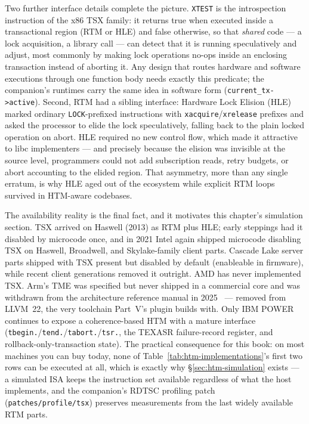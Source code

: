 Two further interface details complete the picture. \texttt{XTEST} is the introspection instruction of the x86 TSX family: it returns true when executed inside a transactional region (RTM or HLE) and false otherwise, so that \emph{shared} code --- a lock acquisition, a library call --- can detect that it is running speculatively and adjust, most commonly by making lock operations no-ops inside an enclosing transaction instead of aborting it. Any design that routes hardware and software executions through one function body needs exactly this predicate; the companion's runtimes carry the same idea in software form (\texttt{current\_tx->active}). Second, RTM had a sibling interface: Hardware Lock Elision (HLE) marked ordinary \texttt{LOCK}-prefixed instructions with \texttt{xacquire}/\texttt{xrelease} prefixes and asked the processor to elide the lock speculatively, falling back to the plain locked operation on abort. HLE required no new control flow, which made it attractive to libc implementers --- and precisely because the elision was invisible at the source level, programmers could not add subscription reads, retry budgets, or abort accounting to the elided region. That asymmetry, more than any single erratum, is why HLE aged out of the ecosystem while explicit RTM loops survived in HTM-aware codebases.

The availability reality is the final fact, and it motivates this chapter's simulation section. TSX arrived on Haswell (2013) as RTM plus HLE; early steppings had it disabled by microcode once, and in 2021 Intel again shipped microcode disabling TSX on Haswell, Broadwell, and Skylake-family client parts. Cascade Lake server parts shipped with TSX present but disabled by default (enableable in firmware), while recent client generations removed it outright. AMD has never implemented TSX. Arm's TME was specified but never shipped in a commercial core and was withdrawn from the architecture reference manual in 2025~\cite{arm25tmew} --- removed from LLVM~22, the very toolchain Part~V's plugin builds with. Only IBM POWER continues to expose a coherence-based HTM with a mature interface (\texttt{tbegin.}/\texttt{tend.}/\texttt{tabort.}/\texttt{tsr.}, the TEXASR failure-record register, and rollback-only-transaction state). The practical consequence for this book: on most machines you can buy today, none of Table~\ref{tab:htm-implementations}'s first two rows can be executed at all, which is exactly why \S\ref{sec:htm-simulation} exists --- a simulated ISA keeps the instruction set available regardless of what the host implements, and the companion's RDTSC profiling patch (\texttt{patches/profile/tsx}) preserves measurements from the last widely available RTM parts.

